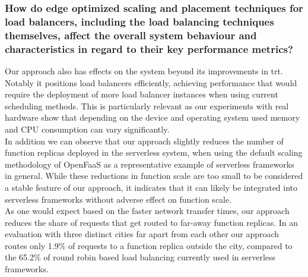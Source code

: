 \subsubsection{How do edge optimized scaling and placement techniques for load balancers, including the load balancing techniques themselves, affect the overall system behaviour
and characteristics in regard to their key performance metrics?}

Our approach also has effects on the system beyond its improvements in \gls{trt}.
Notably it positions load balancers efficiently, achieving performance that would require the deployment of more load balancer instances when using current scheduling methods.
This is particularly relevant as our experiments with real hardware show that depending on the device and operating system used memory and CPU consumption can vary significantly.\\
In addition we can observe that our approach slightly reduces the number of function replicas deployed in the serverless system, when using the default scaling methodology of OpenFaaS\cite{openfaas} as a representative example of serverless frameworks in general.
While these reductions in function scale are too small to be considered a stable feature of our approach, it indicates that it can likely be integrated into serverless frameworks without adverse effect on function scale.\\
As one would expect based on the faster network transfer times, our approach reduces the share of requests that get routed to far-away function replicas.
In an evaluation with three distinct cities far apart from each other our approach routes only 1.9\% of requests to a function replica outside the city, compared to the 65.2\% of round robin based load balancing currently used in serverless frameworks.